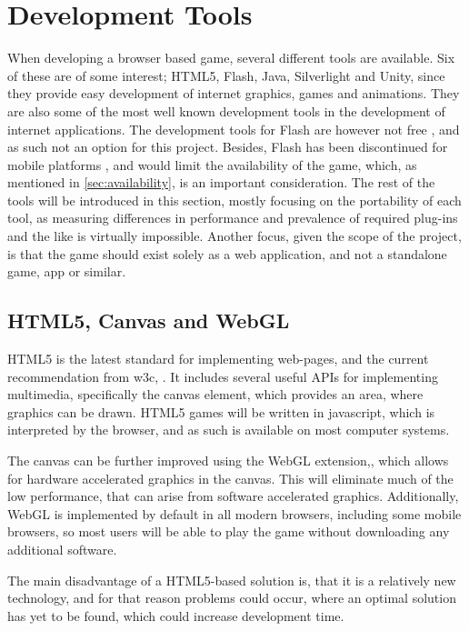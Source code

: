 \section{Development Tools}
\label{sec:tools}

When developing a browser based game, several different tools are available.
Six of these are of some interest; HTML5, Flash, Java, Silverlight and Unity, since they provide easy development of internet graphics, games and animations.
They are also some of the most well known development tools in the development of internet applications.
The development tools for Flash are however not free \cite{adobe13}, and as such not an option for this project.
Besides, Flash has been discontinued for mobile platforms \cite{adobe12}, and would limit the availability of the game, which, as mentioned in \autoref{sec:availability}, is an important consideration.
The rest of the tools will be introduced in this section, mostly focusing on the portability of each tool, as measuring differences in performance and prevalence of required plug-ins and the like is virtually impossible.
Another focus, given the scope of the project, is that the game should exist solely as a web application, and not a standalone game, app or similar.

\subsection{HTML5, Canvas and WebGL}
HTML5 is the latest standard for implementing web-pages, and the current recommendation from \ac{w3c}, \cite{html513}.
It includes several useful APIs for implementing multimedia, specifically the canvas element, which provides an area, where graphics can be drawn.
HTML5 games will be written in javascript, which is interpreted by the browser, and as such is available on most computer systems.\newline

The canvas can be further improved using the WebGL extension,\cite{khronos13}, which allows for hardware accelerated graphics in the canvas. 
This will eliminate much of the low performance, that can arise from software accelerated graphics.
Additionally, WebGL is implemented by default in all modern browsers, including some mobile browsers, so most users will be able to play the game without downloading any additional software.

The main disadvantage of a HTML5-based solution is, that it is a relatively new technology, and for that reason problems could occur, where an optimal solution has yet to be found, which could increase development time.

